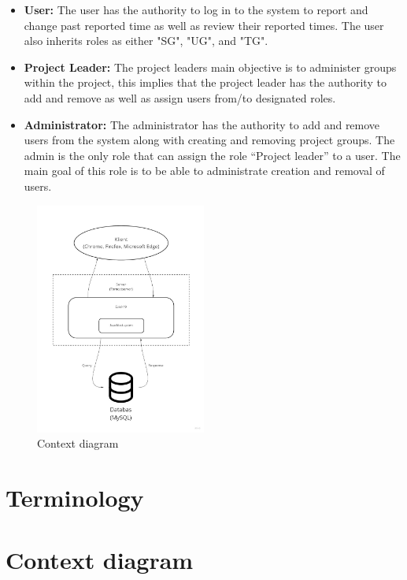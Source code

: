 \documentclass{article}
\begin{document}
\begin{itemize}
  \item \textbf{User:} The user has the authority to log in to the system to report and  change past reported time as well as review their reported times. The user also inherits roles as either "SG", "UG", and "TG".
  \item \textbf{Project Leader:}
  The project leaders main objective is to administer groups within the project, this implies that the project leader has the authority to add and remove as well as assign users from/to designated roles.
   \item \textbf{Administrator:} The administrator has the authority to add and remove users from the system along with creating and removing project groups. The admin is the only role that can assign the role “Project leader” to a user. The main goal of this role is to be able to administrate creation and removal of users.
\end{itemize}

\begin{figure}[placement specifier]
\centering
\includegraphics[width=0.5\textwidth]{Flowchart_6.jpg}
\caption{Context diagram}
\end{figure}

\caption{Image is to complex to understand}

\section{Terminology}



\section{Context diagram}
\end{document}
